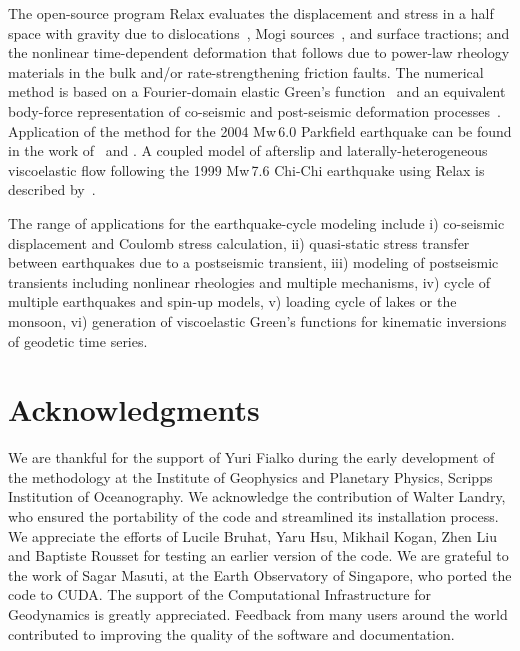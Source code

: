 \documentclass[10pt]{article}
\begin{document}
The open-source program Relax evaluates the displacement and stress in a half space with gravity due to dislocations~\citep[e.g.,][]{okada92}, Mogi sources~\citep{mogi58}, and surface tractions; and the nonlinear time-dependent deformation that follows due to power-law rheology materials in the bulk and/or rate-strengthening friction faults. The numerical method is based on a Fourier-domain elastic Green's function~\citep{barbot+09b,barbot&fialko10a} and an equivalent body-force representation of co-seismic and post-seismic deformation processes~\citep{barbot+09a,barbot&fialko10b}. Application of the method for the 2004 Mw\,6.0 Parkfield earthquake can be found in the work of~\cite{barbot+09a} and \cite{bruhat+11}. A coupled model of afterslip and laterally-heterogeneous viscoelastic flow following the 1999 Mw\,7.6 Chi-Chi earthquake using Relax is described by~\cite{rousset+12}.

The range of applications for the earthquake-cycle modeling include i) co-seismic displacement and Coulomb stress calculation, ii) quasi-static stress transfer between earthquakes due to a postseismic transient, iii) modeling of postseismic transients including nonlinear rheologies and multiple mechanisms, iv) cycle of multiple earthquakes and spin-up models, v) loading cycle of lakes or the monsoon, vi) generation of viscoelastic Green's functions for kinematic inversions of geodetic time series.

\section{Acknowledgments}
We are thankful for the support of Yuri Fialko during the early development of the methodology at the Institute of Geophysics and Planetary Physics, Scripps Institution of Oceanography. We acknowledge the contribution of Walter Landry, who ensured the portability of the code and streamlined its installation process. We appreciate the efforts of Lucile Bruhat, Yaru Hsu, Mikhail Kogan, Zhen Liu and Baptiste Rousset for testing an earlier version of the code. We are grateful to the work of Sagar Masuti, at the Earth Observatory of Singapore, who ported the code to CUDA. The support of the Computational Infrastructure for Geodynamics is greatly appreciated. Feedback from many users around the world contributed to improving the quality of the software and documentation.


\vspace{2.5cm}
\let\thefootnote\relax{}
\end{document}
